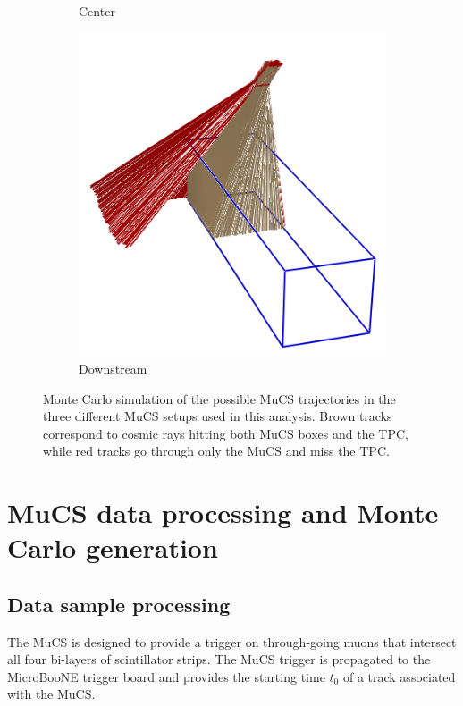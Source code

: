 \documentclass[a4paper,11pt]{article}
\begin{document}
\begin{figure}[htbp]
\begin{subfigure}{0.30\textwidth}
    \caption{Center} \label{fig:centre}
  \end{subfigure}
  \begin{subfigure}{0.30\textwidth}
    \includegraphics[width=\linewidth]{figures/downstream.png}
    \caption{Downstream} \label{fig:downstream}
  \end{subfigure}

  \caption{Monte Carlo simulation of the possible MuCS trajectories in the three different MuCS setups used in this analysis. Brown tracks correspond to cosmic rays hitting both MuCS boxes and the TPC, while red tracks go through only the MuCS and miss the TPC.} \label{fig:mucs}
\end{figure}


\section{MuCS data processing and Monte Carlo generation}\label{sec:merging}

\subsection{Data sample processing}
The MuCS is designed to provide a trigger on through-going muons that intersect all four bi-layers of scintillator strips. The MuCS trigger is propagated to the MicroBooNE trigger board and provides the starting time $t_0$ of a track associated with the MuCS.
\end{document}

